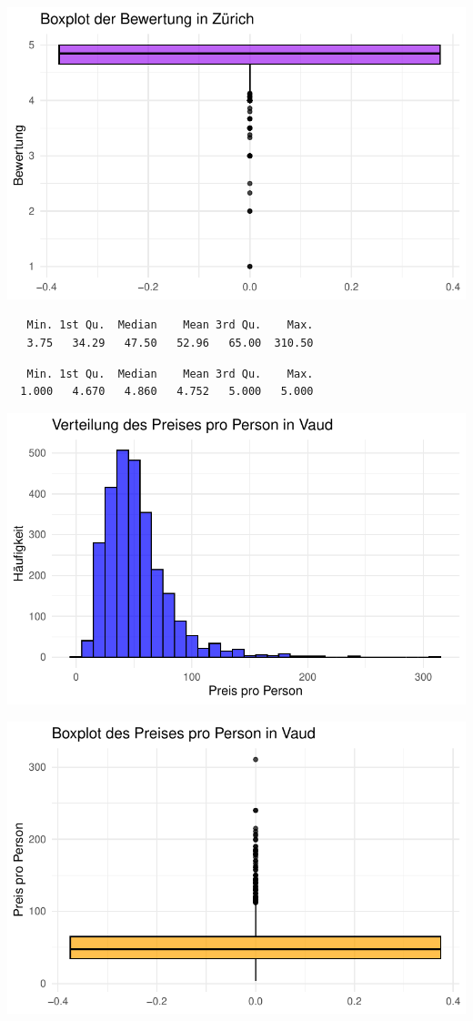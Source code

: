 \documentclass[
  journal,
]{IEEEtran}%
\begin{document}
\includegraphics{main_files/figure-pdf/unnamed-chunk-8-4.pdf}

\begin{verbatim}
   Min. 1st Qu.  Median    Mean 3rd Qu.    Max. 
   3.75   34.29   47.50   52.96   65.00  310.50 
\end{verbatim}

\begin{verbatim}
   Min. 1st Qu.  Median    Mean 3rd Qu.    Max. 
  1.000   4.670   4.860   4.752   5.000   5.000 
\end{verbatim}

\includegraphics{main_files/figure-pdf/unnamed-chunk-9-1.pdf}

\includegraphics{main_files/figure-pdf/unnamed-chunk-9-2.pdf}
\end{document}

